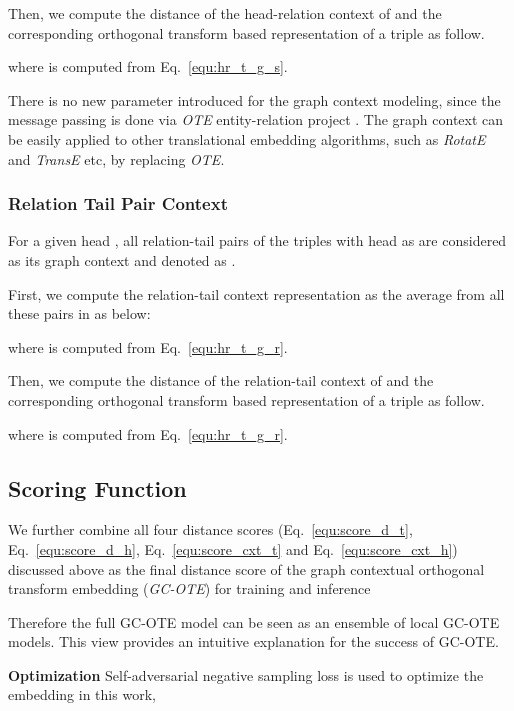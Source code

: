 \documentclass[11pt,a4paper]{article}
\begin{document}
Then, we compute the distance of the head-relation context of  and the corresponding orthogonal transform based representation of a triple  as follow.
 
where  is computed from Eq.~\ref{equ:hr_t_g_s}.

There is no new parameter introduced for the graph context modeling, since the message passing is done via {\it OTE} entity-relation project . The graph context can be easily applied to other translational embedding algorithms, such as {\it RotatE} and {\it TransE} etc, by replacing {\it OTE}.

\subsubsection{Relation Tail Pair Context}

For a given head , all relation-tail pairs  of the triples with head as  are considered as its graph context and denoted as .

First, we compute the relation-tail context representation  as the average from all these pairs in  as below:

where  is computed from Eq.~\ref{equ:hr_t_g_r}.

Then, we compute the distance of the relation-tail context of  and the corresponding orthogonal transform based representation of a triple  as follow.
 
where  is computed from Eq.~\ref{equ:hr_t_g_r}.












\subsection{Scoring Function}

We further combine all four distance scores (Eq.~\ref{equ:score_d_t}, Eq.~\ref{equ:score_d_h}, Eq.~\ref{equ:score_cxt_t} and Eq.~\ref{equ:score_cxt_h}) discussed above as the final distance score of the graph contextual orthogonal transform embedding ({\it  GC-OTE}) for training and inference


Therefore the full GC-OTE model can be seen as an ensemble of  local GC-OTE models. This view provides an intuitive explanation for the success of GC-OTE.

\noindent\textbf{Optimization} Self-adversarial negative sampling loss \cite{Sun2019RotatEKG} is used to optimize the embedding in this work, 
\end{document}
